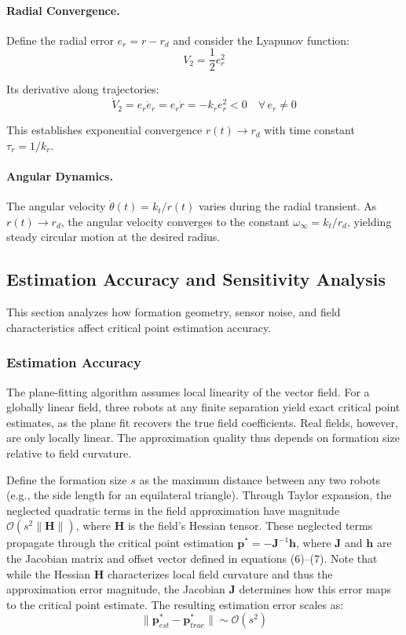 \documentclass[lettersize,journal]{IEEEtran}
\begin{document}
\paragraph{Radial Convergence.}
Define the radial error $e_r = r - r_d$ and consider the Lyapunov function:
\begin{equation}
V_2 = \frac{1}{2}e_r^2
\end{equation}

Its derivative along trajectories:
\begin{equation}
\dot{V}_2 = e_r \dot{e}_r = e_r \dot{r} = -k_r e_r^2 < 0 \quad \forall\, e_r \neq 0
\end{equation}

This establishes exponential convergence $r(t) \to r_d$ with time constant $\tau_r = 1/k_r$.

\paragraph{Angular Dynamics.}
The angular velocity $\dot{\theta}(t) = k_t / r(t)$ varies during the radial transient. As $r(t) \to r_d$, the angular velocity converges to the constant $\omega_\infty = k_t / r_d$, yielding steady circular motion at the desired radius.

\subsection{Estimation Accuracy and Sensitivity Analysis}

This section analyzes how formation geometry, sensor noise, and field characteristics affect critical point estimation accuracy.

\subsubsection{Estimation Accuracy}

The plane-fitting algorithm assumes local linearity of the vector field. For a globally linear field, three robots at any finite separation yield exact critical point estimates, as the plane fit recovers the true field coefficients. Real fields, however, are only locally linear. The approximation quality thus depends on formation size relative to field curvature.

Define the formation size $s$ as the maximum distance between any two robots (e.g., the side length for an equilateral triangle). Through Taylor expansion, the neglected quadratic terms in the field approximation have magnitude $\mathcal{O}(s^2\|\mathbf{H}\|)$, where $\mathbf{H}$ is the field's Hessian tensor. These neglected terms propagate through the critical point estimation $\mathbf{p}^* = -\mathbf{J}^{-1}\mathbf{h}$, where $\mathbf{J}$ and $\mathbf{h}$ are the Jacobian matrix and offset vector defined in equations (6)--(7). Note that while the Hessian $\mathbf{H}$ characterizes local field curvature and thus the approximation error magnitude, the Jacobian $\mathbf{J}$ determines how this error maps to the critical point estimate. The resulting estimation error scales as:
\begin{equation}
\|\mathbf{p}^*_{est} - \mathbf{p}^*_{true}\| \sim \mathcal{O}(s^2)
\end{equation}
\end{document}
